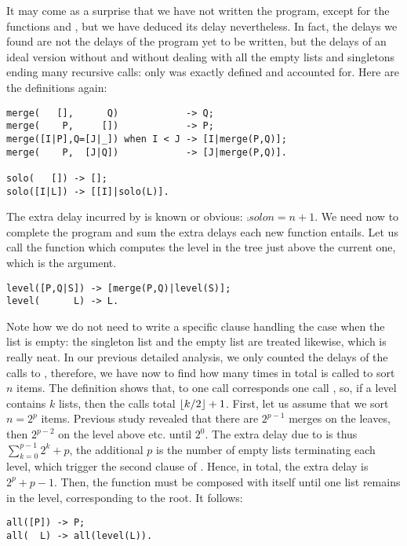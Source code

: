It may come as a surprise that we have not written the program, except
for the functions  and , but we have
deduced its delay nevertheless. In fact, the delays we found are not
the delays of the program yet to be written, but the delays of an
ideal version without  and without dealing with all
the empty lists and singletons ending many recursive calls: only
 was exactly defined and accounted for. Here are the
definitions again:
\begin{verbatim}
merge(   [],      Q)            -> Q;
merge(    P,     [])            -> P;
merge([I|P],Q=[J|_]) when I < J -> [I|merge(P,Q)];
merge(    P,  [J|Q])            -> [J|merge(P,Q)].

solo(   []) -> [];
solo([I|L]) -> [[I]|solo(L)].
\end{verbatim}
The extra delay incurred by  is known or obvious:
\(\comp{solo}{n} = n + 1\). We need now to complete the program and
sum the extra delays each new function entails. Let us call
 the function which computes the level in the tree
just above the current one, which is the argument.
\begin{verbatim}
level([P,Q|S]) -> [merge(P,Q)|level(S)];
level(      L) -> L.
\end{verbatim}
Note how we do not need to write a specific clause handling the case
when the list is empty: the singleton list and the empty list are
treated likewise, which is really neat. In our previous detailed
analysis, we only counted the delays of the calls to
, therefore, we have now to find how many times in
total  is called to sort \(n\) items. The definition
shows that, to one call  corresponds one call
, so, if a level contains \(k\) lists, then the
calls total \(\lfloor{k/2}\rfloor+1\). First, let us assume that we sort
\(n=2^p\) items. Previous study revealed that there are \(2^{p-1}\)
merges on the leaves, then \(2^{p-2}\) on the level above etc. until
\(2^0\). The extra delay due to  is thus
\(\sum_{k=0}^{p-1}{2^k} + p\), the additional \(p\) is the number of
empty lists terminating each level, which trigger the second clause of
. Hence, in total, the extra delay is \(2^p + p -
1\).  Then, the function  must be composed with
itself until one list remains in the level, corresponding to the
root. It follows:
\begin{verbatim}
all([P]) -> P;
all(  L) -> all(level(L)).
\end{verbatim}
